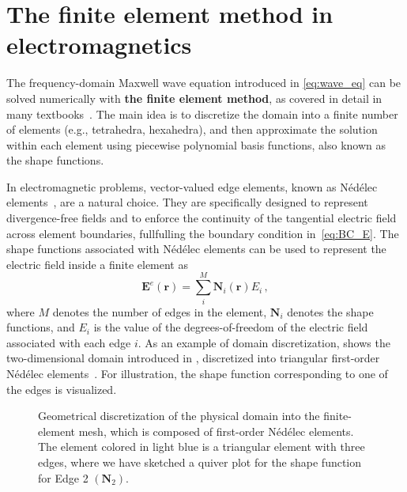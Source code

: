 
    \section{The finite element method in electromagnetics}\label{sec:fem}
 The frequency-domain Maxwell wave equation introduced in \eqref{eq:wave_eq} can be solved numerically with \textbf{the finite element method}, as covered in detail 
 in many textbooks~\cite{jin, fem_book}. The main idea is to discretize the domain into a finite number of elements (e.g., tetrahedra, hexahedra), and then approximate the solution
 within each element using piecewise polynomial basis functions, also known as the shape functions. 
 
 In electromagnetic problems, vector-valued edge elements, known as Né\-dé\-lec elements~\cite{nedelec}, 
 are a natural choice. They are specifically designed to represent divergence-free fields and 
 to enforce the continuity of the tangential electric field across element boundaries, fullfulling the boundary condition in~\eqref{eq:BC_E}.
 The shape functions associated with Nédélec elements can be used to represent the electric field inside a finite element as
    \begin{equation}\label{eq:ned_shape}
 \boldsymbol{E}^e(\mathbf{r})=\sum^M_i \boldsymbol{N}_i(\mathbf{r}) E_i\,,
    \end{equation}
 where $M$ denotes the number of edges in the element, $\boldsymbol{N}_i$ denotes the shape functions, and $E_i$ is the value of the degrees-of-freedom of the electric field associated with each edge $i$. As an example
  of domain discretization,  shows the two-dimensional domain introduced in , discretized
   into triangular first-order Nédélec elements~\cite{nedelec}. For illustration, the shape function corresponding to one of the edges is visualized.

    \begin{figure}[tb]
        \centering

        \caption{Geometrical discretization of the physical domain into the finite-element mesh, which is composed of first-order Nédélec elements. The element colored
 in light blue is a triangular element with three edges, where
 we have sketched a quiver plot for the shape function for Edge
 2 $(\mathbf{N}_2)$.}
        \label{fig:fem}
    \end{figure}
    
